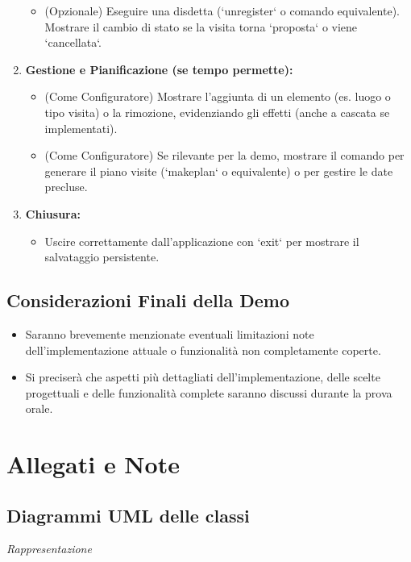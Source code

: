 \documentclass[a4paper,12pt]{article}
\begin{document}
\begin{enumerate}
\begin{itemize}
            \item (Opzionale) Eseguire una disdetta (`unregister` o comando equivalente). Mostrare il cambio di stato se la visita torna `proposta` o viene `cancellata`.
        \end{itemize}
        \item \textbf{Gestione e Pianificazione (se tempo permette):}
        \begin{itemize}
            \item (Come Configuratore) Mostrare l'aggiunta di un elemento (es. luogo o tipo visita) o la rimozione, evidenziando gli effetti (anche a cascata se implementati).
            \item (Come Configuratore) Se rilevante per la demo, mostrare il comando per generare il piano visite (`makeplan` o equivalente) o per gestire le date precluse.
        \end{itemize}
        \item \textbf{Chiusura:}
        \begin{itemize}
            \item Uscire correttamente dall'applicazione con `exit` per mostrare il salvataggio persistente.
        \end{itemize}
    \end{enumerate}

    \subsection{Considerazioni Finali della Demo}
    \begin{itemize}
        \item Saranno brevemente menzionate eventuali limitazioni note dell'implementazione attuale o funzionalità non completamente coperte.
        \item Si preciserà che aspetti più dettagliati dell'implementazione, delle scelte progettuali e delle funzionalità complete saranno discussi durante la prova orale.
    \end{itemize}

    \newpage


    \section{Allegati e Note}

    \subsection{Diagrammi UML delle classi}
    \textit{Rappresentazione }
\end{document}
